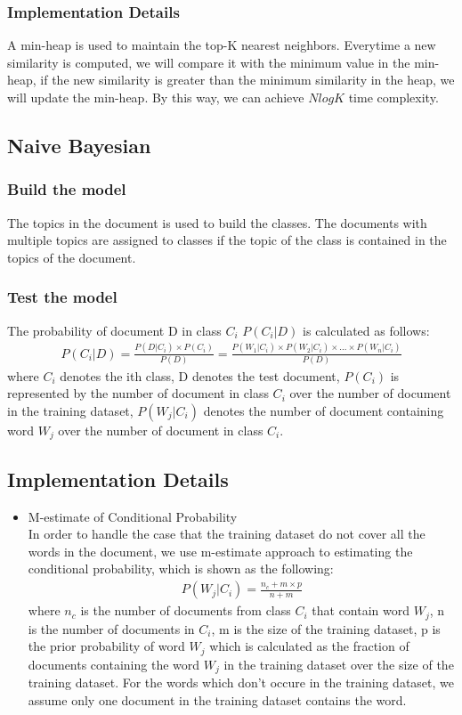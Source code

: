 \documentclass{article}
\begin{document}
\subsubsection{Implementation Details}
A min-heap is used to maintain the top-K nearest neighbors. Everytime a new similarity is computed, we will compare it with the minimum value in the min-heap, if the new similarity is greater than the minimum similarity in the heap, we will update the min-heap. By this way, we can achieve $Nlog K$ time complexity.
\subsection{Naive Bayesian}
\subsubsection{Build the model}
The topics in the document is used to build the classes. The documents with multiple topics are assigned to classes if the topic of the class is contained in the topics of the document.  
\subsubsection{Test the model}
The probability of document D in class $C_i$ $P(C_i|D)$ is calculated as follows:
\begin{align*}
P(C_i|D) = \frac{P(D|C_i) \times P(C_i)}{P(D)}
	 = \frac{P(W_1|C_i) \times P(W_2|C_i) \times ... \times P(W_n|C_i)}{P(D)}				
\end{align*}
where $C_i$ denotes the ith class, D denotes the test document, $P(C_i)$ is represented by the number of document in class $C_i$ over the number of document in the training dataset, $P(W_j|C_i)$ denotes the number of document containing word $W_j$ over the number of document in class $C_i$.
\subsection{Implementation Details}
\begin{itemize}
\item M-estimate of Conditional Probability\\
In order to handle the case that the training dataset do not cover all the words in the document, we use m-estimate approach to estimating the conditional probability, which is shown as the following:
\begin{align*}
P(W_j|C_i) = \frac{n_c + m \times p}{n + m}
\end{align*}
where $n_c$ is the number of documents from class $C_i$ that contain word $W_j$, n is the number of documents in $C_i$, m is the size of the training dataset, p is the prior probability of word $W_j$ which is calculated as the fraction of documents containing the word $W_j$ in the training dataset over the size of the training dataset. For the words which don't occure in the training dataset, we assume only one document in the training dataset contains the word.
\end{itemize}
\end{document}
